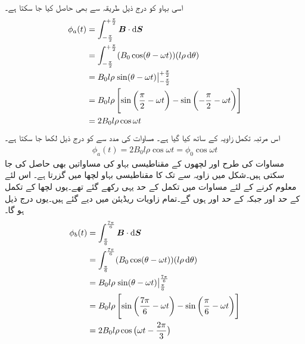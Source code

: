 اسی بہاو کو درج ذیل طریقہ سے بھی حاصل کیا جا سکتا ہے۔
\begin{gather}
\begin{aligned}\label{مساوات_گھومتے_مشین_قطبی_بہاو_بالمقابل_وقت}
\phi_a(t)&=\int_{-\frac{\pi}{2}}^{+\frac{\pi}{2}} \kvec{B} \cdot \dif \kvec{S}\\
&=\int_{-\frac{\pi}{2}}^{+\frac{\pi}{2}} (B_0 \cos (\theta-\omega t))(l \rho \dif \theta)\\
&=B_0 l \rho \left. \sin (\theta-\omega t) \right\vert_{-\frac{\pi}{2}}^{+\frac{\pi}{2}}\\
&=B_0 l \rho \left[\sin \left(\frac{\pi}{2}-\omega t \right )-\sin \left (-\frac{\pi}{2}-\omega t \right) \right]\\
&=2 B_0 l \rho \cos \omega t
\end{aligned}
\end{gather}
اس مرتبہ تکمل زاویہ  کے ساتھ کیا گیا ہے۔ مساوات   کی مدد سے   کو درج ذیل لکھا جا سکتا ہے۔
\begin{align}
\phi_a(t)=2 B_0 l \rho \cos \omega t=\phi_0 \cos \omega t
\end{align}
مساوات   کی طرح    اور  لچھوں کے  مقناطیسی بہاو کی مساواتیں بھی حاصل کی جا سکتی ہیں۔شکل   میں زاویہ  سے   تک کا مقناطیسی بہاو لچھا   میں  گزرتا ہے۔ اس لئے   معلوم کرنے کے لئے مساوات   میں تکمل کے حد یہی رکھے گئے تھے۔یوں لچھا   کے تکمل کے حد    اور  جبکہ  کے حد  اور  ہوں گے۔تمام زاویات ریڈیئن میں دیے گئے ہیں۔یوں درج ذیل ہو گا۔
\begin{gather}
\begin{aligned}
\phi_b(t)&=\int_{\frac{\pi}{6}}^{\frac{7\pi}{6}} \kvec{B} \cdot \dif \kvec{S}\\
&=\int_{\frac{\pi}{6}}^{\frac{7\pi}{6}} (B_0 \cos (\theta-\omega t))(l \rho \dif \theta)\\
&=B_0 l \rho \left. \sin (\theta-\omega t) \right\vert_{\frac{\pi}{6}}^{\frac{7\pi}{6}}\\
&=B_0 l \rho \left[\sin \left(\frac{7\pi}{6}-\omega t \right )-\sin \left (\frac{\pi}{6}-\omega t \right) \right]\\
&=2 B_0 l \rho \cos \big(\omega t-\frac{2\pi}{3}\big)
\end{aligned}
\end{gather}

